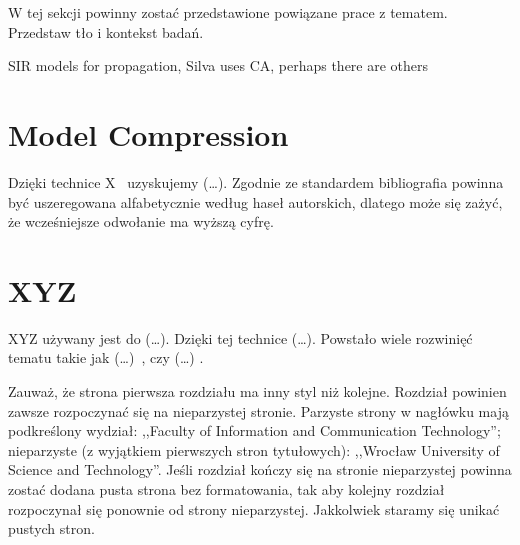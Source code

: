 \label{chapter:related}
W tej sekcji powinny zostać przedstawione powiązane prace z tematem. Przedstaw tło i kontekst badań.

SIR models for propagation, Silva uses CA, perhaps there are others

\section{Model Compression}

Dzięki technice X~\cite{nowak2016} uzyskujemy (\dots). Zgodnie ze standardem bibliografia powinna być uszeregowana alfabetycznie według haseł autorskich, dlatego może się zażyć, że wcześniejsze odwołanie ma wyższą cyfrę.

\section{XYZ}
XYZ używany jest do (\dots). Dzięki tej technice (\dots). Powstało wiele rozwinięć tematu takie jak (\dots)~\cite{nowak2018, w4n2017}, czy (\dots) \cite{babington2008}.

Zauważ, że strona pierwsza rozdziału ma inny styl niż kolejne. Rozdział powinien zawsze rozpoczynać się na nieparzystej stronie. Parzyste strony w nagłówku mają podkreślony wydział: ,,Faculty of Information and Communication Technology''; nieparzyste (z wyjątkiem pierwszych stron tytułowych): ,,Wrocław University of Science and Technology''. Jeśli rozdział kończy się na stronie nieparzystej powinna zostać dodana pusta strona bez formatowania, tak aby kolejny rozdział rozpoczynał się ponownie od strony nieparzystej. Jakkolwiek staramy się unikać pustych stron.